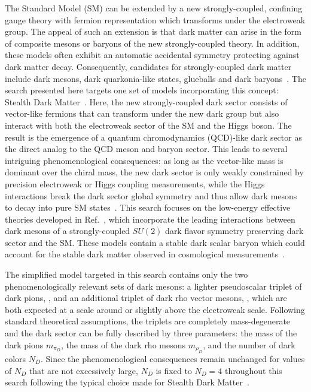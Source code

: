 
The Standard Model (SM) can be extended by a new strongly-coupled, confining gauge theory with fermion representation which transforms under the electroweak group.
The appeal of such an extension is that dark matter can arise in the form of composite mesons or baryons of the new strongly-coupled theory. In addition, these models often exhibit an automatic accidental symmetry protecting against dark matter decay.
Consequently, candidates for strongly-coupled dark matter include dark mesons, dark quarkonia-like states, glueballs and dark baryons~\cite{Kribs:2016cew,Butterworth:2021jto}.
The search presented here targets one set of models incorporating this concept: Stealth Dark Matter~\cite{Appelquist:2015yfa}.
Here, the new strongly-coupled dark sector consists of vector-like fermions that can transform under the new dark group but also interact with both the electroweak sector of the SM and the Higgs boson.
The result is the emergence of a quantum chromodynamics (QCD)-like dark sector as the direct analog to the QCD meson and baryon sector.
This leads to several intriguing phenomenological consequences:
as long as the vector-like mass is dominant over the chiral mass, the new dark sector is only weakly constrained by precision electroweak or Higgs coupling measurements, while the Higgs interactions break the dark sector global symmetry and thus allow dark mesons to decay into pure SM states~\cite{Kribs:2018ilo}.
This search focuses on the low-energy effective theories developed in Ref.~\cite{Kribs:2018oad}, which incorporate the leading interactions between dark mesons of a strongly-coupled $SU(2)$ dark flavor symmetry preserving dark sector and the SM.
These models contain a stable dark scalar baryon which could account for the stable dark matter observed in cosmological measurements~\cite{Appelquist:2015yfa}.

The simplified model targeted in this search contains only the two phenomenologically relevant sets of dark mesons: a lighter pseudoscalar triplet of dark pions, \piD, and an additional triplet of dark rho vector mesons, \rhoD, which are both expected at a scale around or slightly above the electroweak scale.
Following standard theoretical assumptions, the triplets are completely mass-degenerate and the dark sector can be fully described by three parameters: the mass of the dark pions $m_{\pi_D}$, the mass of the dark rho mesons $m_{\rho_D}$, and the number of dark colors $N_D$.
Since the phenomenological consequences remain unchanged for values of $N_D$ that are not excessively large, $N_D$ is fixed to $N_D=4$ throughout this search following the typical choice made for Stealth Dark Matter~\cite{Appelquist:2015yfa}. 

